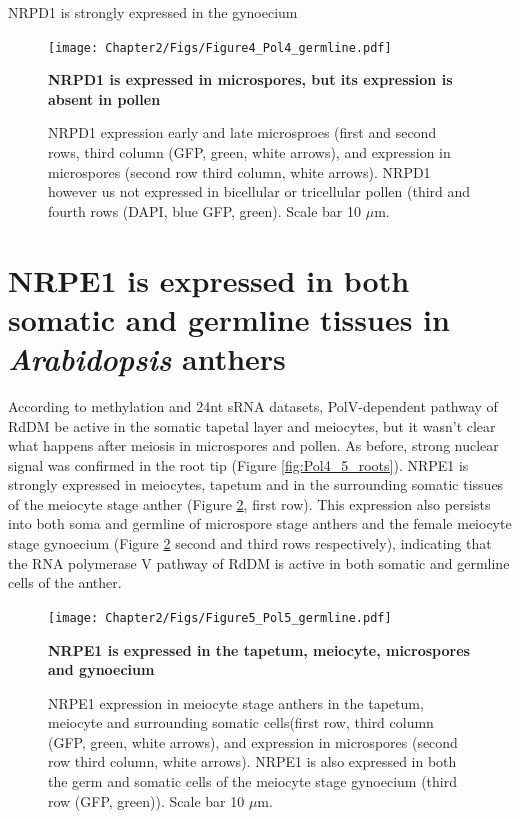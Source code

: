 NRPD1 is strongly expressed in the gynoecium

\begin{figure}[htbp!] 
\centering    
    \texttt{[image: Chapter2/Figs/Figure4\_Pol4\_germline.pdf]}
\caption{\textbf{NRPD1 is expressed in microspores, but its expression is absent in pollen}}
\label{fig:Pol4_germ}
\captionsetup{font=small}
    \caption*{NRPD1 expression early and late microsproes (first and second rows, third column (GFP, green, white arrows), and expression in microspores (second row third column, white arrows). NRPD1 however us not expressed in bicellular or tricellular pollen (third and fourth rows (DAPI, blue GFP, green). Scale bar 10 $\mu$m.}
\end{figure}

\section{NRPE1 is expressed in both somatic and germline tissues in \textit{Arabidopsis} anthers}

According to methylation and 24nt sRNA datasets,  PolV-dependent pathway of RdDM be active in the somatic tapetal layer and meiocytes, but it wasn't clear what happens after meiosis in microspores and pollen. As before, strong nuclear signal was confirmed in the root tip (Figure \ref{fig:Pol4_5_roots}).  NRPE1 is strongly expressed in meiocytes, tapetum and in the surrounding somatic tissues of the meiocyte stage anther (Figure \ref{fig:Pol5_germ}, first row). This expression also persists into both soma and germline of microspore stage anthers and the female meiocyte stage gynoecium (Figure \ref{fig:Pol5_germ} second and third rows respectively), indicating that the RNA polymerase V pathway of RdDM is active in both somatic and germline cells of the anther. 

\begin{figure}[htbp!] 
\centering    
    \texttt{[image: Chapter2/Figs/Figure5\_Pol5\_germline.pdf]}
\caption{\textbf{NRPE1 is expressed in the tapetum, meiocyte, microspores and gynoecium}}
\label{fig:Pol5_germ}
\captionsetup{font=small}
    \caption*{NRPE1 expression in meiocyte stage anthers in the tapetum, meiocyte and surrounding somatic cells(first row, third column (GFP, green, white arrows), and expression in microspores (second row third column, white arrows). NRPE1 is also expressed in both the germ and somatic cells of the meiocyte stage gynoecium (third row (GFP, green)). Scale bar 10 $\mu$m.}
\end{figure}


